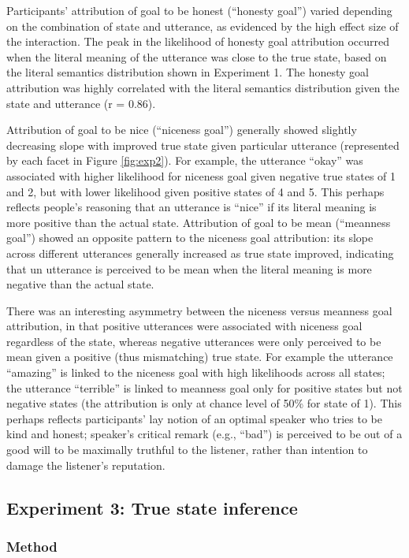 \documentclass[10pt,letterpaper]{article}
\begin{document}
Participants' attribution of goal to be honest (``honesty goal'') varied depending on the combination of state and utterance, as evidenced by the high effect size of the interaction. The peak in the likelihood of honesty goal attribution occurred when the literal meaning of the utterance was close to the true state, based on the literal semantics distribution shown in Experiment 1. The honesty goal attribution was highly correlated with the literal semantics distribution given the state and utterance (r = 0.86).

Attribution of goal to be nice (``niceness goal'') generally showed slightly decreasing slope with improved true state given particular utterance (represented by each facet in Figure \ref{fig:exp2}). For example, the utterance ``okay'' was associated with higher likelihood for niceness goal given negative true states of 1 and 2, but with lower likelihood given positive states of 4 and 5. This perhaps reflects people's reasoning that an utterance is ``nice'' if its literal meaning is more positive than the actual state. Attribution of goal to be mean (``meanness goal'') showed an opposite pattern to the niceness goal attribution: its slope across different utterances generally increased as true state improved, indicating that un utterance is perceived to be mean when the literal meaning is more negative than the actual state.

There was an interesting asymmetry between the niceness versus meanness goal attribution, in that positive utterances were associated with niceness goal regardless of the state, whereas negative utterances were only perceived to be mean given a positive (thus mismatching) true state. For example the utterance ``amazing'' is linked to the niceness goal with high likelihoods across all states; the utterance ``terrible'' is linked to meanness goal only for positive states but not negative states (the attribution is only at chance level of 50\% for state of 1). This perhaps reflects participants' lay notion of an optimal speaker who tries to be kind and honest; speaker's critical remark (e.g., ``bad'') is perceived to be out of a good will to be maximally truthful to the listener, rather than intention to damage the listener's reputation.

\subsection{Experiment 3: True state inference}

\subsubsection{Method}
\end{document}
